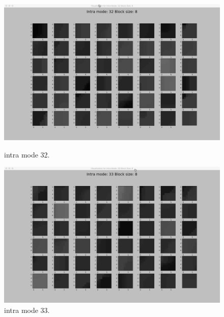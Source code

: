 \begin{figure}[H]
    \begin{minipage}{0.49\textwidth}
        \includegraphics[width=\linewidth]{Figures/visu-size8x8/8-32}
        \caption[Intra mode 32]{intra mode 32.}
        \label{fig:size8_mode32}
    \end{minipage}
    \hspace{\fill} %
    \begin{minipage}{0.49\textwidth}
        \includegraphics[width=\linewidth]{Figures/visu-size8x8/8-33}
        \caption[Intra mode 33]{intra mode 33.}
        \label{fig:size8_mode33}
    \end{minipage}
\end{figure}
